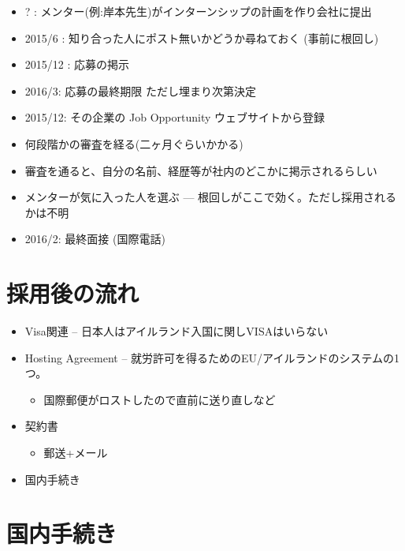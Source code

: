 \begin{itemize}
\item ? : メンター(例:岸本先生)がインターンシップの計画を作り会社に提出
\item 2015/6  : 知り合った人にポスト無いかどうか尋ねておく (事前に根回し)
\item 2015/12 : 応募の掲示
\item 2016/3:  応募の最終期限 ただし埋まり次第決定
\item 2015/12:  その企業の Job Opportunity ウェブサイトから登録
\item 何段階かの審査を経る(二ヶ月ぐらいかかる)
\item 審査を通ると、自分の名前、経歴等が社内のどこかに掲示されるらしい
\item メンターが気に入った人を選ぶ --- 根回しがここで効く。ただし採用されるかは不明
\item 2016/2: 最終面接 (国際電話)
\end{itemize}

\section{採用後の流れ}
\label{sec-4}

\begin{itemize}
\item Visa関連 -- 日本人はアイルランド入国に関しVISAはいらない
\item Hosting Agreement -- 就労許可を得るためのEU/アイルランドのシステムの1つ。
\begin{itemize}
\item 国際郵便がロストしたので直前に送り直しなど
\end{itemize}
\item 契約書
\begin{itemize}
\item 郵送+メール
\end{itemize}
\item 国内手続き
\end{itemize}

\section{国内手続き}
\label{sec-5}

